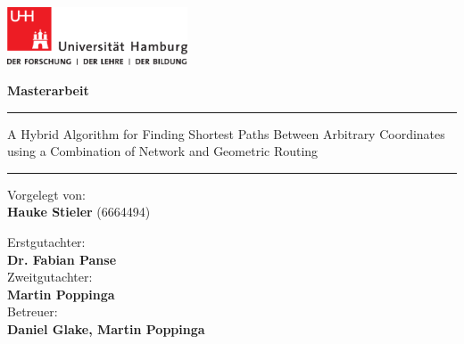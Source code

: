 

\begin{titlepage}
	
	\includegraphics[width=0.4\textwidth]{images/UHH-Logo_2010_Farbe_CMYK.pdf}
	\vspace{1cm}
	
	\begin{center}
		
		{
			\Large
			\textbf{Masterarbeit}
			\par
		}
		
		\vspace{1.5cm}
		\hrule
		\vspace{1cm}
		
		{
			\titlefont
			\huge
			A Hybrid Algorithm for Finding Shortest Paths Between Arbitrary Coordinates using a Combination of Network and Geometric Routing
			\par
		}
		
		\vspace{1cm}
		\hrule
		\vspace{1.5cm}
	\end{center}
	
	\begin{multicols}{2}
		\raggedright
		Vorgelegt von:\\
		\textbf{Hauke Stieler} (6664494)\\
		
		\columnbreak
		\raggedleft
		
		Erstgutachter:\\
		\textbf{Dr. Fabian Panse}\\
		\vspace{0.25cm}
		Zweitgutachter:\\
		\textbf{Martin Poppinga}\\
		\vspace{0.25cm}
		Betreuer:\\
		\textbf{Daniel Glake, Martin Poppinga}
	\end{multicols}

	\vspace{0.5cm}


\end{titlepage}
